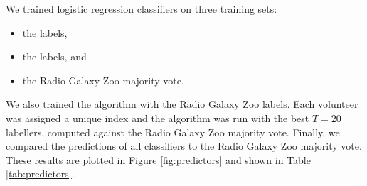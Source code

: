   We trained logistic regression classifiers on three training sets:
  \begin{itemize}
    \item the \citeauthor{norris06} labels,
    \item the \citeauthor{fan15} labels, and
    \item the Radio Galaxy Zoo majority vote.
  \end{itemize}
  We also trained the \citeauthor{raykar10} algorithm with the Radio Galaxy Zoo
  labels. Each volunteer was assigned a unique index and the algorithm was run
  with the best $T = 20$ labellers, computed against the Radio Galaxy Zoo
  majority vote. Finally, we compared the predictions of all classifiers to the
  Radio Galaxy Zoo majority vote. These results are plotted in Figure
  \ref{fig:predictors} and shown in Table \ref{tab:predictors}.



